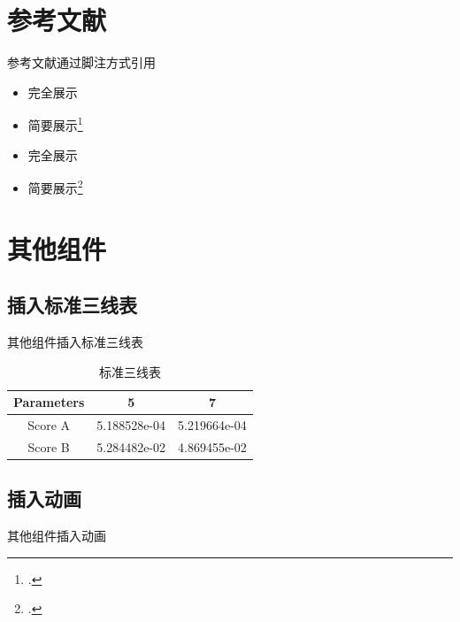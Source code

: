 \documentclass[no-math, compress]{beamer}
\begin{document}
\section{参考文献}


\begin{frame}{参考文献}{通过脚注方式引用}
    \begin{itemize}[]
        \item 完全展示
        \item 简要展示\footcite{bourdin2000numerical}
        \item 完全展示
        \item 简要展示\footcite{MathSymbolsinLaTeXbypolossk}
    \end{itemize}
\end{frame}


\section{其他组件}


\subsection{插入标准三线表}


\begin{frame}{其他组件}{插入标准三线表}
    \begin{table}
        \centering
        \begin{tabular}{ccc}
            \toprule
            Parameters & 5            & 7            \\
            \midrule
            Score A    & 5.188528e-04 & 5.219664e-04 \\
            Score B    & 5.284482e-02 & 4.869455e-02 \\
            \bottomrule
        \end{tabular}
        \caption{标准三线表}
    \end{table}
\end{frame}


\subsection{插入动画}


\begin{frame}{其他组件}{插入动画}
    \begin{center}
    \end{center}
\end{frame}
\end{document}
